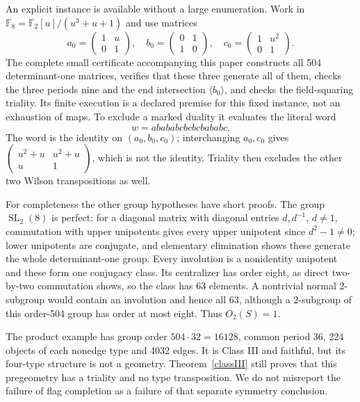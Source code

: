\documentclass[11pt,a4paper]{article}
\newcommand{\gen}[1]{\langle#1\rangle}\newcommand{\F}{\mathbb F}\newcommand{\Aut}{\operatorname{Aut}}
\begin{document}
An explicit instance is available without a large enumeration. Work in
$\F_8=\F_2[u]/(u^3+u+1)$ and use matrices
\[
 a_0=\begin{pmatrix}1&u\\0&1\end{pmatrix},\quad
 b_0=\begin{pmatrix}0&1\\1&0\end{pmatrix},\quad
 c_0=\begin{pmatrix}1&u^2\\0&1\end{pmatrix}.
\]
The complete small certificate accompanying this paper constructs all
504 determinant-one matrices, verifies that these three generate all
of them, checks the three periods nine and the end intersection
$\gen{b_0}$, and checks the field-squaring triality. Its finite
execution is a declared premise for this fixed instance, not an
exhaustion of maps. To exclude a marked duality it evaluates the
literal word
\[
 w=abababcbcbcbababc.
\]
The word is the identity on $(a_0,b_0,c_0)$; interchanging $a_0,c_0$
gives $\left(\begin{smallmatrix}u^2+u&u^2+u\\u&1\end{smallmatrix}\right)$,
which is not the identity. Triality then excludes the other two
Wilson transpositions as well.

For completeness the other group hypotheses have short proofs.
The group $\operatorname{SL}_2(8)$ is perfect: for a diagonal
matrix with diagonal entries $d,d^{-1}$, $d\ne1$, commutation
with upper unipotents gives every upper unipotent since $d^2-1\ne0$;
lower unipotents are conjugate, and elementary elimination shows these
generate the whole determinant-one group. Every involution is a
nonidentity unipotent and these form one conjugacy class. Its
centralizer has order eight, as direct two-by-two commutation shows,
so the class has 63 elements. A nontrivial normal 2-subgroup would
contain an involution and hence all 63, although a 2-subgroup of
this order-504 group has order at most eight. Thus $O_2(S)=1$.

The product example has group order $504\cdot32=16128$, common
period 36, 224 objects of each nonedge type and 4032 edges. It is
Class III and faithful, but its four-type structure is not a geometry.
Theorem~\ref{classIII} still proves that this pregeometry has a
triality and no type transposition. We do not misreport the failure
of flag completion as a failure of that separate symmetry conclusion.
\end{document}
